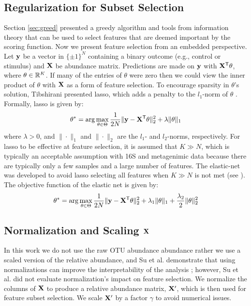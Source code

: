 \documentclass{acm_proc_article-sp}
\begin{document}
\subsection{Regularization for Subset Selection}
Section \ref{sec:greed} presented a greedy algorithm and tools from information theory that can be used to select features that are deemed important by the scoring function. Now we present feature selection from an embedded perspective. Let ${\mathbf y}$ be a vector in $\{\pm 1\}^{N}$ containing a binary outcome (e.g., control or stimulus) and ${\mathbf X}$ be abundance matrix. Predictions are made on ${\mathbf y}$ with ${\mathbf X}^{\textsf{T}}\theta$, where $\theta \in {\mathbb R}^K$. If many of the entries of $\theta$ were zero then we could view the inner product of $\theta$ with ${\mathbf X}$ as a form of feature selection. To encourage sparsity in $\theta$'s solution, Tibshirani presented lasso, which adds a penalty to the $l_1$-norm of $\theta$ \cite{Tibshirani1996JRSS}. Formally, lasso is given by:
\begin{align}
  \theta^* = \arg\max_{\theta\in\Theta} \frac{1}{2N} \| {\mathbf y} - {\mathbf X}^{\textsf{T}}\theta \|_2^2 + \lambda \|\theta\|_1
\end{align}
where $\lambda > 0$, and $\|\cdot\|_1$ and $\|\cdot\|_2$ are the $l_1$- and $l_2$-norms, respectively. For lasso to be effective at feature selection, it is assumed that $K \gg N$, which is typically an acceptable assumption with 16S and metagenimic data because there are typically only a few samples and a large number of features. The elastic-net was developed to avoid lasso selecting all features when  $K \gg N$ is not met (see \cite{Zou2005JRSS}). The objective function of the elastic net is given by:
\begin{align}
  \theta^* = \arg\max_{\theta\in\Theta} \frac{1}{2N} \| {\mathbf y} - {\mathbf X}^{\textsf{T}}\theta \|_2^2 + \lambda_1 \|\theta\|_1 + \frac{\lambda_2}{2} \|\theta\|_2^2
\end{align}

\subsection{Normalization and Scaling ${\mathbf X}$}

In this work we do not use the raw OTU abundance abundance rather we use a scaled version of the relative abundance, and Su et al. demonstrate that using normalizations can improve the interpretability of the analysis \cite{Su2012TCBB}; however, Su et al. did not evaluate normalization's impact on feature selection. We normalize the columns of ${\mathbf X}$ to produce a relative abundance matrix, ${\mathbf X}'$, which is then used for feature subset selection. We scale ${\mathbf X}'$ by a factor $\gamma$ to avoid numerical issues. 
\end{document}
